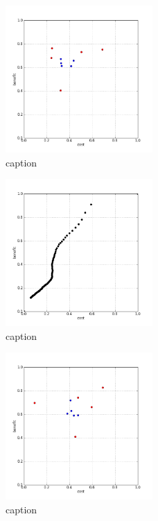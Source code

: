 %
\begin{figure}[!ht]
	\centering
	\includegraphics[width=0.5\textwidth]{img/p1figs/computeFrameStateAnders_simpleCompare_smooth12_tol0.png}
	\caption{caption}
\end{figure}
%
\begin{figure}[!ht]
	\centering
	\includegraphics[width=0.5\textwidth]{img/p1figs/computeFrameStateAnders_simpleCompare_smooth12_tol0_AUC.png}
	\caption{caption}
\end{figure}
%
\begin{figure}[!ht]
	\centering
	\includegraphics[width=0.5\textwidth]{img/p1figs/computeFrameStateContrastOnly_sectionCompareBetter_smooth0_tol12.png}
	\caption{caption}
\end{figure}
